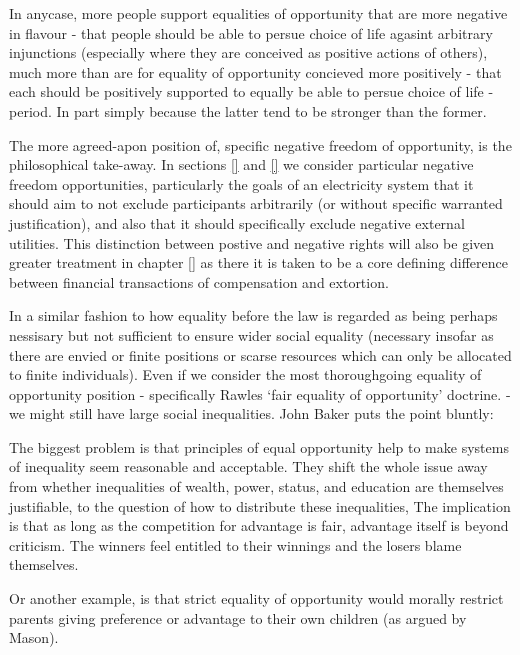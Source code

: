 \documentclass{article}
\begin{document}
In anycase, more people support equalities of opportunity that are more negative in flavour - that people should be able to persue choice of life agasint arbitrary injunctions (especially where they are conceived as positive actions of others), 
much more than are for equality of opportunity concieved more positively - that each should be positively supported to equally be able to persue choice of life -period.
In part simply because the latter tend to be stronger than the former.


The more agreed-apon position of, specific negative freedom of opportunity, is the philosophical take-away.
In sections \ref{} and \ref{} we consider particular negative freedom opportunities, particularly the goals of an electricity system that it should aim to not exclude participants arbitrarily (or without specific warranted justification), and also that it should specifically exclude negative external utilities.
This distinction between postive and negative rights will also be given greater treatment in chapter \ref{} as there it is taken to be a core defining difference between financial transactions of compensation and extortion.

In a similar fashion to how equality before the law is regarded as being perhaps nessisary but not sufficient to ensure wider social equality (necessary insofar as there are envied or finite positions or scarse resources which can only be allocated to finite individuals).
Even if we consider the most thoroughgoing equality of opportunity position - specifically Rawles `fair equality of opportunity' doctrine.\cite{sep-egalitarianism} - we might still have large social inequalities.
John Baker puts the point bluntly:

\begin{displayquote}
The biggest problem is that principles of equal opportunity help to make systems of inequality seem reasonable and acceptable. They shift the whole issue away from whether inequalities of wealth, power, status, and education are themselves justifiable, to the question of how to distribute these inequalities, The implication is that as long as the competition for advantage is fair, advantage itself is beyond criticism. The winners feel entitled to their winnings and the losers blame themselves.
\end{displayquote}

Or another example, is that strict equality of opportunity would morally restrict parents giving preference or advantage to their own children (as argued by Mason).
\end{document}
